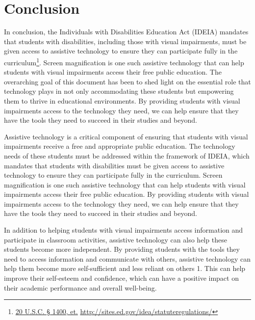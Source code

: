\hypertarget{conclusion}{}\chapter[\raggedright Conclusion\hfill\break ]{Conclusion}\label{conclusion}

In conclusion, the Individuals with Disabilities Education Act (IDEIA) mandates that students with disabilities, including those with visual impairments, must be given access to assistive technology to ensure they can participate fully in the curriculum\footnote{\raggedright \href{http://sites.ed.gov/idea/statuteregulations/}{20 U.S.C. § 1400, et.} \url{http://sites.ed.gov/idea/statuteregulations/}}. Screen magnification is one such assistive technology that can help students with visual impairments access their free public education. The overarching goal of this document has been  to shed light on the essential role that technology plays in not only accommodating these students but empowering them to thrive in educational environments. By providing students with visual impairments access to the technology they need, we can help ensure that they have the tools they need to succeed in their studies and beyond.

Assistive technology is a critical component of ensuring that students with visual impairments receive a free and appropriate public education. The technology needs of these students must be addressed within the framework of IDEIA, which mandates that students with disabilities must be given access to assistive technology to ensure they can participate fully in the curriculum. Screen magnification is one such assistive technology that can help students with visual impairments access their free public education. By providing students with visual impairments access to the technology they need, we can help ensure that they have the tools they need to succeed in their studies and beyond.

In addition to helping students with visual impairments access information and participate in classroom activities, assistive technology can also help these students become more independent. By providing students with the tools they need to access information and communicate with others, assistive technology can help them become more self-sufficient and less reliant on others 1. This can help improve their self-esteem and confidence, which can have a positive impact on their academic performance and overall well-being.

